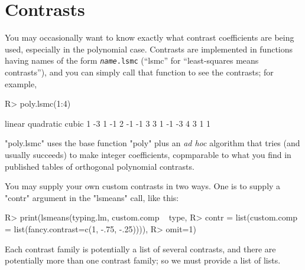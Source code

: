 \documentclass{article}
\begin{document}
\section{Contrasts}
You may occasionally want to know exactly what contrast coefficients are being used, especially in the polynomial case. Contrasts are implemented in functions having names of the form \texttt{\textsl{name}.lsmc} (``lsmc'' for ``least-squares means contrasts''), and you can simply call that function to see the contrasts; for example,
\begin{Winput}
R> poly.lsmc(1:4)
\end{Winput}
\begin{Woutput}
  linear quadratic cubic
1     -3         1    -1
2     -1        -1     3
3      1        -1    -3
4      3         1     1
\end{Woutput}
"poly.lsmc" uses the base function "poly" plus an \emph{ad hoc} algorithm that tries (and usually succeeds) to make integer coefficients, copmparable to what you find in published tables of orthogonal polynomial contrasts.

You may supply your own custom contrasts in two ways. One is to supply a "contr" argument in the "lsmeans" call, like this:
\begin{Winput}
R> print(lsmeans(typing.lm, custom.comp ~ type, 
R>               contr = list(custom.comp = list(fancy.contrast=c(1, -.75, -.25)))), 
R>     omit=1)
\end{Winput}
Each contrast family is potentially a list of several contrasts, and there are potentially more than one contrast family; so we must provide a list of lists.
\end{document}
